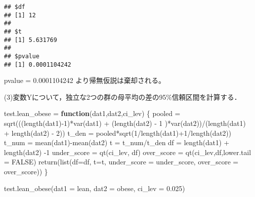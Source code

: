 \documentclass[
]{article}
\newenvironment{Shaded}{\begin{snugshade}}{\end{snugshade}}
\newcommand{\AttributeTok}[1]{\textcolor[rgb]{0.77,0.63,0.00}{#1}}
\newcommand{\ConstantTok}[1]{\textcolor[rgb]{0.00,0.00,0.00}{#1}}
\newcommand{\ControlFlowTok}[1]{\textcolor[rgb]{0.13,0.29,0.53}{\textbf{#1}}}
\newcommand{\DecValTok}[1]{\textcolor[rgb]{0.00,0.00,0.81}{#1}}
\newcommand{\FloatTok}[1]{\textcolor[rgb]{0.00,0.00,0.81}{#1}}
\newcommand{\FunctionTok}[1]{\textcolor[rgb]{0.00,0.00,0.00}{#1}}
\newcommand{\NormalTok}[1]{#1}
\newcommand{\OtherTok}[1]{\textcolor[rgb]{0.56,0.35,0.01}{#1}}
\newcommand{\SpecialCharTok}[1]{\textcolor[rgb]{0.00,0.00,0.00}{#1}}
\begin{document}
\begin{verbatim}
## $df
## [1] 12
## 
## $t
## [1] 5.631769
## 
## $pvalue
## [1] 0.0001104242
\end{verbatim}

pvalue = 0.0001104242 より帰無仮説は棄却される。

(3)変数Yについて，独立な2つの群の母平均の差の95\%信頼区間を計算する．

\begin{Shaded}
\begin{Highlighting}[]
\NormalTok{test.lean\_obese }\OtherTok{=} \ControlFlowTok{function}\NormalTok{(dat1,dat2,ci\_lev)}
\NormalTok{\{}
\NormalTok{  pooled }\OtherTok{=} \FunctionTok{sqrt}\NormalTok{(((}\FunctionTok{length}\NormalTok{(dat1)}\SpecialCharTok{{-}}\DecValTok{1}\NormalTok{)}\SpecialCharTok{*}\FunctionTok{var}\NormalTok{(dat1) }\SpecialCharTok{+}\NormalTok{ (}\FunctionTok{length}\NormalTok{(dat2) }\SpecialCharTok{{-}} \DecValTok{1}\NormalTok{ )}\SpecialCharTok{*}\FunctionTok{var}\NormalTok{(dat2))}\SpecialCharTok{/}\NormalTok{(}\FunctionTok{length}\NormalTok{(dat1) }\SpecialCharTok{+} \FunctionTok{length}\NormalTok{(dat2) }\SpecialCharTok{{-}} \DecValTok{2}\NormalTok{))}
\NormalTok{  t\_den }\OtherTok{=}\NormalTok{ pooled}\SpecialCharTok{*}\FunctionTok{sqrt}\NormalTok{(}\DecValTok{1}\SpecialCharTok{/}\FunctionTok{length}\NormalTok{(dat1)}\SpecialCharTok{+}\DecValTok{1}\SpecialCharTok{/}\FunctionTok{length}\NormalTok{(dat2))}
\NormalTok{  t\_num }\OtherTok{=} \FunctionTok{mean}\NormalTok{(dat1)}\SpecialCharTok{{-}}\FunctionTok{mean}\NormalTok{(dat2)}
\NormalTok{  t }\OtherTok{=}\NormalTok{ t\_num}\SpecialCharTok{/}\NormalTok{t\_den}
\NormalTok{  df }\OtherTok{=} \FunctionTok{length}\NormalTok{(dat1) }\SpecialCharTok{+} \FunctionTok{length}\NormalTok{(dat2) }\SpecialCharTok{{-}}\DecValTok{1}
\NormalTok{  under\_score }\OtherTok{=} \FunctionTok{qt}\NormalTok{(ci\_lev, df)}
\NormalTok{  over\_score }\OtherTok{=} \FunctionTok{qt}\NormalTok{(ci\_lev,df,}\AttributeTok{lower.tail =} \ConstantTok{FALSE}\NormalTok{)}
  \FunctionTok{return}\NormalTok{(}\FunctionTok{list}\NormalTok{(}\AttributeTok{df=}\NormalTok{df, }\AttributeTok{t=}\NormalTok{t, }\AttributeTok{under\_score =}\NormalTok{ under\_score, }\AttributeTok{over\_score =}\NormalTok{ over\_score))}
\NormalTok{\}}

\FunctionTok{test.lean\_obese}\NormalTok{(}\AttributeTok{dat1 =}\NormalTok{ lean, }\AttributeTok{dat2 =}\NormalTok{ obese, }\AttributeTok{ci\_lev =} \FloatTok{0.025}\NormalTok{)}
\end{Highlighting}
\end{Shaded}
\end{document}
